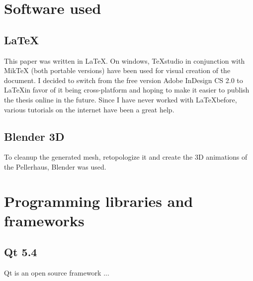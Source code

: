 \section{Software used}

\subsection{\LaTeX}
This paper was written in \LaTeX. On windows, TeXstudio in conjunction with MikTeX (both portable versions) have been used for visual creation of the document. I decided to switch from the free version Adobe InDesign CS 2.0 to \LaTeX in favor of it being cross-platform and hoping to make it easier to publish the thesis online in the future. Since I have never worked with \LaTeX before, various tutorials \parencite{ytLaTeX,webLaTeX-Tutorial} on the internet have been a great help.

\subsection{Blender 3D}
To cleanup the generated mesh, retopologize it and create the 3D animations of the Pellerhaus, Blender was used.


\section{Programming libraries and frameworks}

\subsection{Qt 5.4}

Qt is an open source framework ...